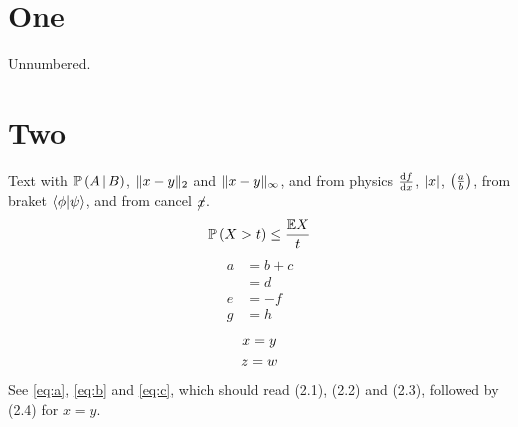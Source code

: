 \documentclass{article}
\numberwithin{equation}{section}
\newcommand{\cond}[2]{#1 \,\middle|\, #2}
\begin{document}
\section{One}
Unnumbered.
\section{Two}
Text with $\prob{\cond{A}{B}}$, $\dist{x}{y}$ and $\dist[\infty]{x}{y}$, and
from physics $\dv{f}{x}$, $\abs{x}$, $\qty(\frac{a}{b})$, from braket
$\braket{\phi|\psi}$, and from cancel $\cancel{x}$.
\begin{equation}\label{eq:a}
    \mathbb{P}\left(X > t\right) \le \frac{\mathbb{E}X}{t}
\end{equation}
\begin{align}
    a &= b + c \label{eq:b}\\
      &= d \nonumber\\
    e &= -f \label{eq:c}\\
    g &= h \tag{$*$}
\end{align}
\begin{gather}
    x = y \\
    z = w \notag
\end{gather}
See \eqref{eq:a}, \eqref{eq:b} and \eqref{eq:c}, which should read (2.1),
(2.2) and (2.3), followed by (2.4) for $x = y$.
\end{document}
